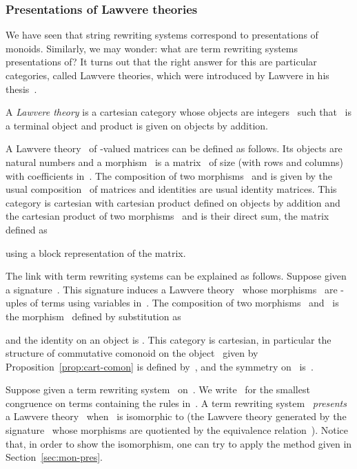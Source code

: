 \documentclass{LMCS}
\begin{document}
\subsubsection{Presentations of Lawvere theories}
\label{sec:pres-law}
We have seen that string rewriting systems correspond to presentations of
monoids. Similarly, we may wonder: what are term rewriting systems presentations of? It turns
out that the right answer for this are particular categories, called Lawvere
theories, which were introduced by Lawvere in his thesis~\cite{lawvere:phd}.

\begin{defi}
  A \emph{Lawvere theory} is a cartesian category whose objects are
  integers~ such that~ is a terminal object and product is given on
  objects by addition.
\end{defi}

\begin{exa}
  \label{ex:Nmat}
  A Lawvere theory~ of -valued matrices can be defined as
  follows. Its objects are natural numbers and a morphism~ is a
  matrix~ of size  (with  rows and  columns) with coefficients in~. The composition
   of two morphisms~ and \hbox{} is given
  by the usual composition~ of matrices and identities are usual
  identity matrices. This category is cartesian with cartesian product defined
  on objects by addition and the cartesian product of two morphisms~
  and \hbox{} is their direct sum, \ie the matrix~ defined as
  
  using a block representation of the matrix.
\end{exa}

The link with term rewriting systems can be explained as follows. Suppose given
a signature~. This signature induces a Lawvere theory~
whose morphisms~ are -uples  of terms using
variables in~. The composition \hbox{}
of two morphisms~ and~ is the morphism~ defined by
substitution as

and the identity on an object  is . This category is
cartesian, in particular the structure of commutative comonoid  on the object~ given by
Proposition~\ref{prop:cart-comon} is defined by~,
 and the symmetry on~ is~.

Suppose given a term rewriting system~ on~. We write~ for
the smallest congruence on terms containing the rules in~. A term rewriting
system~ \emph{presents} a Lawvere theory~ when~ is isomorphic to
 (the Lawvere theory generated by the signature~
whose morphisms are quotiented by the equivalence relation~).  Notice
that, in order to show the isomorphism, one can try to apply the method given in
Section~\ref{sec:mon-pres}.
\end{document}
